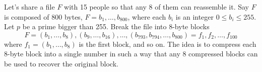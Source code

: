 \documentclass[11pt]{article}
\newcommand{\integers}{\mathbb{Z}}
\begin{document}

\noindent Let's share a file $F$ with 15 people so that any 8 of them can reassemble it. Say $F$ is composed of 800 bytes, $F = b_1, \ldots, b_{800}$, where each $b_i$ is an integer $0\leq b_i\leq 255$. Let $p$ be a prime bigger than 255. Break the file into $8$-byte blocks
\[
F = (b_1, \ldots, b_8), (b_9, \ldots, b_{16}), \ldots, (b_{793}, b_{794}, \ldots,  b_{800}) = f_1, f_2, \ldots, f_{100}
\]
where $f_1 = (b_1, \ldots, b_8)$ is the first block, and so on. The idea is to compress each $8$-byte block into a single number in such a way that any $8$ compressed blocks can be used to recover the original block.\\
\end{document}
